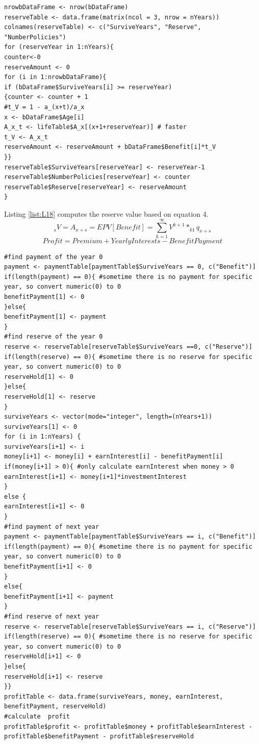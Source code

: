 \documentclass[12pt]{article}
\begin{document}
\begin{lstlisting}[caption={Calculating The Reserve Value },captionpos=b,label={list:L18}]
nrowbDataFrame <- nrow(bDataFrame)
reserveTable <- data.frame(matrix(ncol = 3, nrow = nYears))
colnames(reserveTable) <- c("SurviveYears", "Reserve", "NumberPolicies")
for (reserveYear in 1:nYears){
counter<-0
reserveAmount <- 0
for (i in 1:nrowbDataFrame){
if (bDataFrame$SurviveYears[i] >= reserveYear)
{counter <- counter + 1 
#t_V = 1 - a_(x+t)/a_x
x <- bDataFrame$Age[i]
A_x_t <- lifeTable$A_x[(x+1+reserveYear)] # faster
t_V <- A_x_t
reserveAmount <- reserveAmount + bDataFrame$Benefit[i]*t_V
}}
reserveTable$SurviveYears[reserveYear] <- reserveYear-1
reserveTable$NumberPolicies[reserveYear] <- counter
reserveTable$Reserve[reserveYear] <- reserveAmount
}
\end{lstlisting}
Listing \ref{list:L18} computes the reserve value based on equation 4.
\begin{equation}
_{s}V=A_{x+s}
     = EPV [Benefit]
     =\sum_{k=1}^{\infty}V^{k+1} * _{k1}q_{x+s}
\end{equation}
\begin{equation}
Profit= Premium + Yearly Interests - Benefit Payment
\end{equation}
\begin{lstlisting}[caption={Calculating The Annual Profit and The Reserve Value },captionpos=b,label={list:L19}]
#find payment of the year 0
payment <- paymentTable[paymentTable$SurviveYears == 0, c("Benefit")] 
if(length(payment) == 0){ #sometime there is no payment for specific year, so convert numeric(0) to 0
benefitPayment[1] <- 0
}else{
benefitPayment[1] <- payment
}
#find reserve of the year 0
reserve <- reserveTable[reserveTable$SurviveYears ==0, c("Reserve")]
if(length(reserve) == 0){ #sometime there is no reserve for specific year, so convert numeric(0) to 0
reserveHold[1] <- 0
}else{
reserveHold[1] <- reserve
}
surviveYears <- vector(mode="integer", length=(nYears+1))
surviveYears[1] <- 0
for (i in 1:nYears) {
surviveYears[i+1] <- i
money[i+1] <- money[i] + earnInterest[i] - benefitPayment[i] 
if(money[i+1] > 0){ #only calculate earnInterest when money > 0
earnInterest[i+1] <- money[i+1]*investmentInterest
}
else {
earnInterest[i+1] <- 0
}
#find payment of next year
payment <- paymentTable[paymentTable$SurviveYears == i, c("Benefit")] 
if(length(payment) == 0){ #sometime there is no payment for specific year, so convert numeric(0) to 0
benefitPayment[i+1] <- 0
}
else{
benefitPayment[i+1] <- payment
}
#find reserve of next year
reserve <- reserveTable[reserveTable$SurviveYears == i, c("Reserve")]
if(length(reserve) == 0){ #sometime there is no reserve for specific year, so convert numeric(0) to 0
reserveHold[i+1] <- 0
}else{
reserveHold[i+1] <- reserve
}} 
profitTable <- data.frame(surviveYears, money, earnInterest, benefitPayment, reserveHold)
#calculate  profit
profitTable$profit <- profitTable$money + profitTable$earnInterest - profitTable$benefitPayment - profitTable$reserveHold
\end{lstlisting}
\end{document}
